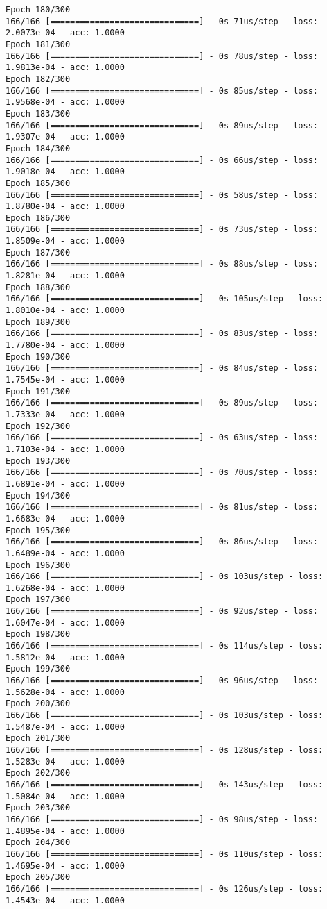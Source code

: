 \documentclass[11pt]{article}
\begin{document}
\begin{Verbatim}[commandchars=\\\{\}]
Epoch 180/300
166/166 [==============================] - 0s 71us/step - loss: 2.0073e-04 - acc: 1.0000
Epoch 181/300
166/166 [==============================] - 0s 78us/step - loss: 1.9813e-04 - acc: 1.0000
Epoch 182/300
166/166 [==============================] - 0s 85us/step - loss: 1.9568e-04 - acc: 1.0000
Epoch 183/300
166/166 [==============================] - 0s 89us/step - loss: 1.9307e-04 - acc: 1.0000
Epoch 184/300
166/166 [==============================] - 0s 66us/step - loss: 1.9018e-04 - acc: 1.0000
Epoch 185/300
166/166 [==============================] - 0s 58us/step - loss: 1.8780e-04 - acc: 1.0000
Epoch 186/300
166/166 [==============================] - 0s 73us/step - loss: 1.8509e-04 - acc: 1.0000
Epoch 187/300
166/166 [==============================] - 0s 88us/step - loss: 1.8281e-04 - acc: 1.0000
Epoch 188/300
166/166 [==============================] - 0s 105us/step - loss: 1.8010e-04 - acc: 1.0000
Epoch 189/300
166/166 [==============================] - 0s 83us/step - loss: 1.7780e-04 - acc: 1.0000
Epoch 190/300
166/166 [==============================] - 0s 84us/step - loss: 1.7545e-04 - acc: 1.0000
Epoch 191/300
166/166 [==============================] - 0s 89us/step - loss: 1.7333e-04 - acc: 1.0000
Epoch 192/300
166/166 [==============================] - 0s 63us/step - loss: 1.7103e-04 - acc: 1.0000
Epoch 193/300
166/166 [==============================] - 0s 70us/step - loss: 1.6891e-04 - acc: 1.0000
Epoch 194/300
166/166 [==============================] - 0s 81us/step - loss: 1.6683e-04 - acc: 1.0000
Epoch 195/300
166/166 [==============================] - 0s 86us/step - loss: 1.6489e-04 - acc: 1.0000
Epoch 196/300
166/166 [==============================] - 0s 103us/step - loss: 1.6268e-04 - acc: 1.0000
Epoch 197/300
166/166 [==============================] - 0s 92us/step - loss: 1.6047e-04 - acc: 1.0000
Epoch 198/300
166/166 [==============================] - 0s 114us/step - loss: 1.5812e-04 - acc: 1.0000
Epoch 199/300
166/166 [==============================] - 0s 96us/step - loss: 1.5628e-04 - acc: 1.0000
Epoch 200/300
166/166 [==============================] - 0s 103us/step - loss: 1.5487e-04 - acc: 1.0000
Epoch 201/300
166/166 [==============================] - 0s 128us/step - loss: 1.5283e-04 - acc: 1.0000
Epoch 202/300
166/166 [==============================] - 0s 143us/step - loss: 1.5084e-04 - acc: 1.0000
Epoch 203/300
166/166 [==============================] - 0s 98us/step - loss: 1.4895e-04 - acc: 1.0000
Epoch 204/300
166/166 [==============================] - 0s 110us/step - loss: 1.4695e-04 - acc: 1.0000
Epoch 205/300
166/166 [==============================] - 0s 126us/step - loss: 1.4543e-04 - acc: 1.0000

\end{Verbatim}
\end{document}
